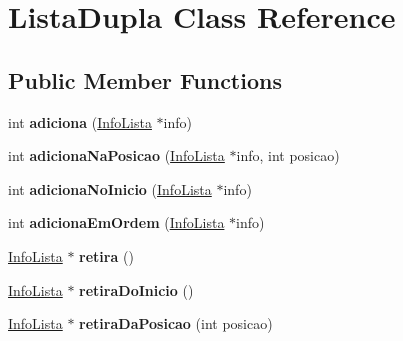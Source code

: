 \hypertarget{classListaDupla}{\section{\-Lista\-Dupla \-Class \-Reference}
\label{classListaDupla}
}
\subsection*{\-Public \-Member \-Functions}
\begin{DoxyCompactItemize}
\item 
\hypertarget{classListaDupla_a70801439ae83e03a684d1c70d0c08a69}{int {\bfseries adiciona} (\hyperlink{classInfoLista}{\-Info\-Lista} $\ast$info)}\label{classListaDupla_a70801439ae83e03a684d1c70d0c08a69}

\item 
\hypertarget{classListaDupla_aa9829b28006e3e6bf6850469bb32c198}{int {\bfseries adiciona\-Na\-Posicao} (\hyperlink{classInfoLista}{\-Info\-Lista} $\ast$info, int posicao)}\label{classListaDupla_aa9829b28006e3e6bf6850469bb32c198}

\item 
\hypertarget{classListaDupla_a0fa87d6283fd6190fc953e1d30b3cd82}{int {\bfseries adiciona\-No\-Inicio} (\hyperlink{classInfoLista}{\-Info\-Lista} $\ast$info)}\label{classListaDupla_a0fa87d6283fd6190fc953e1d30b3cd82}

\item 
\hypertarget{classListaDupla_a191743e603de22c545fdb5c1a784bbbf}{int {\bfseries adiciona\-Em\-Ordem} (\hyperlink{classInfoLista}{\-Info\-Lista} $\ast$info)}\label{classListaDupla_a191743e603de22c545fdb5c1a784bbbf}

\item 
\hypertarget{classListaDupla_acab9802d1a2867f7d654e8ee16a60721}{\hyperlink{classInfoLista}{\-Info\-Lista} $\ast$ {\bfseries retira} ()}\label{classListaDupla_acab9802d1a2867f7d654e8ee16a60721}

\item 
\hypertarget{classListaDupla_ae14d82b9040dfa6d65ca18718d9146a9}{\hyperlink{classInfoLista}{\-Info\-Lista} $\ast$ {\bfseries retira\-Do\-Inicio} ()}\label{classListaDupla_ae14d82b9040dfa6d65ca18718d9146a9}

\item 
\hypertarget{classListaDupla_a005f7d7fb3002bf05165f3b3e32452d1}{\hyperlink{classInfoLista}{\-Info\-Lista} $\ast$ {\bfseries retira\-Da\-Posicao} (int posicao)}\label{classListaDupla_a005f7d7fb3002bf05165f3b3e32452d1}


\end{DoxyCompactItemize}
